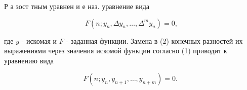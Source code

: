 \documentclass[10pt]{article}
\begin{document}
Р а зост тным уравнен и е наз. уравнение вида



\[

F\left(n ; y_{n}, \Delta y_{n}, \ldots, \Delta^{m} y_{n}\right)=0,

\]



где $y$ - искомая и $F$ - заданная функции. Замена в (2) конечных разностей их выражениями через значения искомой функции согласно (1) приводит к уравнению вида



\[

F\left(n ; y_{n}, y_{n+1}, \ldots, y_{n+m}\right)=0 \text {. }

\]
\end{document}
